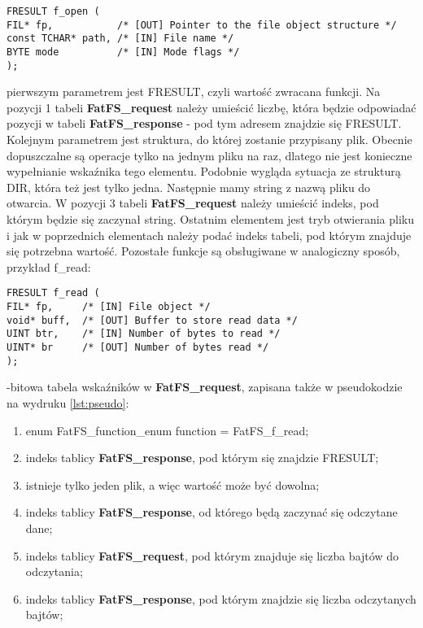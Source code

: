 \documentclass[12pt,a4paper]{article}
\begin{document}
\begin{lstlisting}[float=!h, style=customc, caption={Funkcja f\_open}, label={lst:fopen}, belowskip=-10pt]
FRESULT f_open (
FIL* fp,           /* [OUT] Pointer to the file object structure */
const TCHAR* path, /* [IN] File name */
BYTE mode          /* [IN] Mode flags */
);
\end{lstlisting}
\noindent pierwszym parametrem jest FRESULT, czyli wartość zwracana funkcji. Na pozycji 1 tabeli \textbf{FatFS\_request} należy umieścić liczbę, która będzie odpowiadać pozycji w tabeli \textbf{FatFS\_response} - pod tym adresem znajdzie się FRESULT. Kolejnym parametrem jest struktura, do której zostanie przypisany plik. Obecnie dopuszczalne są operacje tylko na jednym pliku na raz, dlatego nie jest konieczne wypełnianie wskaźnika tego elementu. Podobnie wygląda sytuacja ze strukturą DIR, która też jest tylko jedna. Następnie mamy string z nazwą pliku do otwarcia. W pozycji 3 tabeli \textbf{FatFS\_request} należy umieścić indeks, pod którym będzie się zaczynał string. Ostatnim elementem jest tryb otwierania pliku i jak w poprzednich elementach należy podać indeks tabeli, pod którym znajduje się potrzebna wartość. Pozostałe funkcje są obsługiwane w analogiczny sposób, przykład f\_read:
\begin{lstlisting}[float=!h, style=customc, caption={Funkcja f\_read}, label={lst:fread}, belowskip=-10pt]
FRESULT f_read (
FIL* fp,     /* [IN] File object */
void* buff,  /* [OUT] Buffer to store read data */
UINT btr,    /* [IN] Number of bytes to read */
UINT* br     /* [OUT] Number of bytes read */
);
\end{lstlisting}

-bitowa tabela wskaźników w \textbf{FatFS\_request}, zapisana także w pseudokodzie na wydruku \ref{lst:pseudo}:
\begin{enumerate}
	\setlength\itemsep{0mm}
	\setcounter{enumi}{-1}
	\item enum FatFS\_function\_enum function = FatFS\_f\_read;
	\item indeks tablicy \textbf{FatFS\_response}, pod którym się znajdzie FRESULT;
	\item istnieje tylko jeden plik, a więc wartość może być dowolna;
	\item indeks tablicy \textbf{FatFS\_response}, od którego będą zaczynać się odczytane dane;
	\item indeks tablicy \textbf{FatFS\_request}, pod którym znajduje się liczba bajtów do odczytania;
	\item indeks tablicy \textbf{FatFS\_response}, pod którym znajdzie się liczba odczytanych bajtów;
\end{enumerate}
\end{document}
